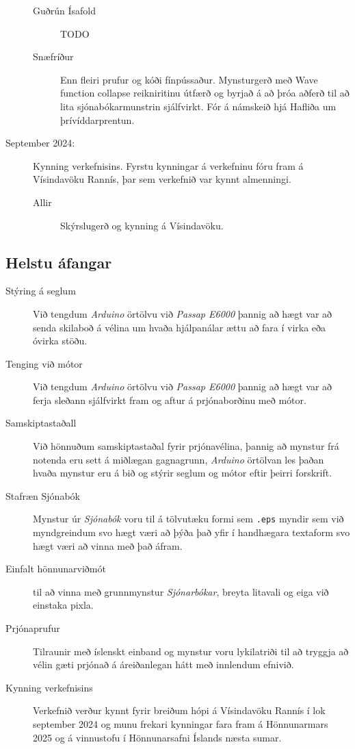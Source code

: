 \documentclass[a4paper,12pt,twoside]{article}
\begin{document}
\begin{description}
\begin{description}
\begin{enumerate}
        \end{enumerate}
        \item[Guðrún Ísafold] TODO
       \item[Snæfríður] Enn fleiri prufur og kóði fínpússaður. Mynsturgerð með Wave function collapse reikniritinu útfærð og byrjað á að þróa aðferð til að lita sjónabókarmunstrin sjálfvirkt. Fór á námskeið hjá Hafliða um þrívíddarprentun.
    \end{description}
    \item[September 2024:] Kynning verkefnisins. Fyrstu kynningar á verkefninu fóru fram á Vísindavöku Rannís, þar sem verkefnið var kynnt almenningi. 
    \begin{description}
        \item[Allir] Skýrslugerð og kynning á Vísindavöku.
    \end{description}
\end{description}

\subsection{Helstu áfangar}
\begin{description}
    \item [Stýring á seglum] Við tengdum \textit{Arduino} örtölvu við \textit{Passap E6000} þannig að hægt var að senda skilaboð á vélina um hvaða hjálpanálar ættu að fara í virka eða óvirka stöðu. 
    \item [Tenging við mótor] Við tengdum \textit{Arduino} örtölvu við \textit{Passap E6000} þannig að hægt var að ferja sleðann sjálfvirkt fram og aftur á prjónaborðinu með mótor. 
    \item [Samskiptastaðall] Við hönnuðum samskiptastaðal fyrir prjónavélina, þannig að mynstur frá notenda eru sett á miðlægan gagnagrunn, \textit{Arduino} örtölvan les þaðan hvaða mynstur eru á bið og stýrir seglum og mótor eftir þeirri forskrift. 
    \item [Stafræn Sjónabók] Mynstur úr \textit{Sjónabók} voru til á tölvutæku formi sem \texttt{.eps} myndir sem við myndgreindum svo hægt væri að þýða það yfir í handhægara textaform svo hægt væri að vinna með það áfram. 
    \item [Einfalt hönnunarviðmót] til að vinna með grunnmynstur \textit{Sjónarbókar}, breyta litavali og eiga við einstaka pixla.
    \item [Prjónaprufur] Tilraunir með íslenskt einband og mynstur voru lykilatriði til að tryggja að vélin gæti prjónað á áreiðanlegan hátt með innlendum efnivið.
    \item [Kynning verkefnisins] Verkefnið verður kynnt fyrir breiðum hópi á Vísindavöku Rannís í lok september 2024 og munu frekari kynningar fara fram á Hönnunarmars 2025 og á vinnustofu í Hönnunarsafni Íslands næsta sumar.
\end{description}
\end{document}
